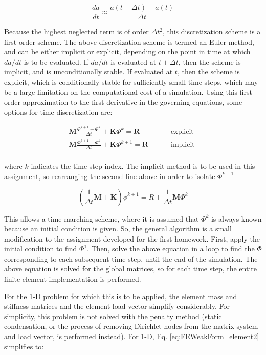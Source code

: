 \documentclass[10pt]{article}
\begin{document}
\begin{equation}
\frac{da}{dt}\approx\frac{a(t+\Delta t)-a(t)}{\Delta t}
\end{equation}

Because the highest neglected term is of order \(\Delta t^2\), this discretization scheme is a first-order scheme. The above discretization scheme is termed an Euler method, and can be either implicit or explicit, depending on the point in time at which \(da/dt\) is to be evaluated. If \(da/dt\) is evaluated at \(t+\Delta t\), then the scheme is implicit, and is unconditionally stable. If evaluated at \(t\), then the scheme is explicit, which is conditionally stable for sufficiently small time steps, which may be a large limitation on the computational cost of a simulation. Using this first-order approximation to the first derivative in the governing equations, some options for time discretization are:

\begin{equation}
\begin{aligned}
\textbf{M}\frac{\Phi^{k+1}-\Phi^k}{\Delta t}+\textbf{K}\Phi^{k}=\textbf{R} & \quad\quad\text{ explicit }\\
\textbf{M}\frac{\Phi^{k+1}-\Phi^k}{\Delta t}+\textbf{K}\Phi^{k+1}=\textbf{R} & \quad\quad\text{ implicit }\\
\end{aligned}
\end{equation}

where \(k\) indicates the time step index. The implicit method is to be used in this assignment, so rearranging the second line above in order to isolate \(\Phi^{k+1}\)

\begin{equation}
\left(\frac{1}{\Delta t}\textbf{M}+\textbf{K}\right)\phi^{k+1}=R+\frac{1}{\Delta t}\textbf{M}\Phi^k
\end{equation}

This allows a time-marching scheme, where it is assumed that \(\Phi^k\) is always known because an initial condition is given. So, the general algorithm is a small modification to the assignment developed for the first homework. First, apply the initial condition to find \(\Phi^1\). Then, solve the above equation in a loop to find the \(\Phi\) corresponding to each subsequent time step, until the end of the simulation. The above equation is solved for the global matrices, so for each time step, the entire finite element implementation is performed. 

For the 1-D problem for which this is to be applied, the element mass and stiffness matrices and the element load vector simplify considerably. For simplicity, this problem is not solved with the penalty method (static condensation, or the process of removing Dirichlet nodes from the matrix system and load vector, is performed instead). For 1-D, Eq. \eqref{eq:FEWeakForm_element2} simplifies to:
\end{document}
